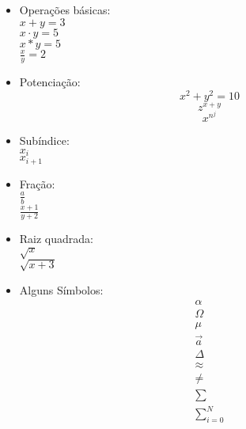 \documentclass[12pt]{article}
\begin{document}
\begin{itemize}
    \item Operações básicas: \\
          $x + y = 3$ \\
          $x \cdot y = 5$ \\
          $x * y = 5$ \\
          $\frac{x}{y} = 2$

          \medskip

    \item Potenciação:
          \[
              x^2 + y^2 = 10
          \]
          \[
              z^{x+y}
          \]
          \[
              x^{n^j}
          \]

          \medskip

    \item Subíndice: \\
          $x_i$ \\
          $x_{i+1}$

          \medskip

    \item Fração: \\
          $\frac{a}{b}$ \\
          $\frac{x+1}{y+2}$

          \medskip

    \item Raiz quadrada: \\
          $\sqrt{x}$ \\
          $\sqrt{x+3}$

          \medskip

    \item Alguns Símbolos:
          \[
              \begin{array}{c}
                  \alpha  \\
                  \Omega  \\
                  \mu     \\
                  \vec{a} \\
                  \Delta  \\
                  \approx \\
                  \neq    \\
                  \sum    \\
                  \sum_{i=0}^{N}
              \end{array}
          \]

          \medskip


\end{itemize}
\end{document}
